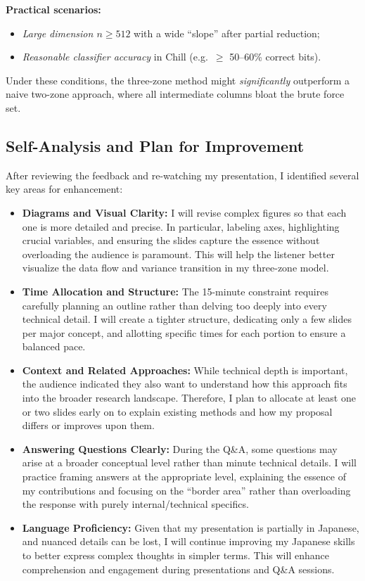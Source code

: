 \documentclass[12pt]{article}
\begin{document}
\textbf{Practical scenarios:}
\begin{itemize}
    \item \emph{Large dimension $n\ge 512$} with a wide “slope” after partial reduction; 
    \item \emph{Reasonable classifier accuracy} in Chill (e.g.\ $\ge$ 50--60\% correct bits). 
\end{itemize}
Under these conditions, the three-zone method might \emph{significantly} outperform a naive two-zone approach, where all intermediate columns bloat the brute force set.

\subsection*{Self-Analysis and Plan for Improvement}

After reviewing the feedback and re-watching my presentation, I identified several key areas for enhancement:

\begin{itemize}
    \item \textbf{Diagrams and Visual Clarity:} 
    I will revise complex figures so that each one is more detailed and precise. In particular, labeling axes, highlighting crucial variables, and ensuring the slides capture the essence without overloading the audience is paramount. This will help the listener better visualize the data flow and variance transition in my three-zone model.

    \item \textbf{Time Allocation and Structure:} 
    The 15-minute constraint requires carefully planning an outline rather than delving too deeply into every technical detail. I will create a tighter structure, dedicating only a few slides per major concept, and allotting specific times for each portion to ensure a balanced pace.

    \item \textbf{Context and Related Approaches:}
    While technical depth is important, the audience indicated they also want to understand how this approach fits into the broader research landscape. Therefore, I plan to allocate at least one or two slides early on to explain existing methods and how my proposal differs or improves upon them.

    \item \textbf{Answering Questions Clearly:}
    During the Q\&A, some questions may arise at a broader conceptual level rather than minute technical details. I will practice framing answers at the appropriate level, explaining the essence of my contributions and focusing on the “border area” rather than overloading the response with purely internal/technical specifics.

    \item \textbf{Language Proficiency:}
    Given that my presentation is partially in Japanese, and nuanced details can be lost, I will continue improving my Japanese skills to better express complex thoughts in simpler terms. This will enhance comprehension and engagement during presentations and Q\&A sessions.
\end{itemize}
\end{document}
